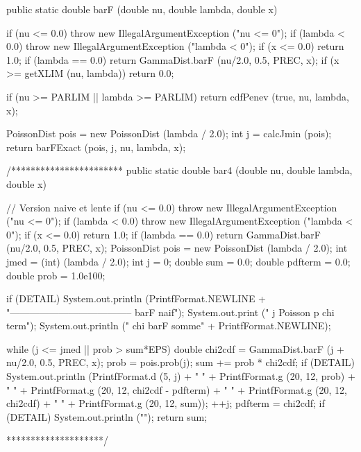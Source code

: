 \begin{code}

   public static double barF (double nu, double lambda, double x)\begin{hide} {
      if (nu <= 0.0)
         throw new IllegalArgumentException ("nu <= 0");
      if (lambda < 0.0)
         throw new IllegalArgumentException ("lambda < 0");
      if (x <= 0.0)
         return 1.0;
      if (lambda == 0.0)
         return GammaDist.barF (nu/2.0, 0.5, PREC, x);
      if (x >= getXLIM (nu, lambda))
         return 0.0;

      if (nu >= PARLIM || lambda >= PARLIM)
         return cdfPenev (true, nu, lambda, x);

      PoissonDist pois = new PoissonDist (lambda / 2.0);
      int j = calcJmin (pois);
      return barFExact (pois, j, nu, lambda, x);
   }

/***********************
   public static double bar4 (double nu, double lambda, double x)
   {
      // Version naive et lente
      if (nu <= 0.0)
         throw new IllegalArgumentException ("nu <= 0");
      if (lambda < 0.0)
         throw new IllegalArgumentException ("lambda < 0");
      if (x <= 0.0)
         return 1.0;
      if (lambda == 0.0)
         return GammaDist.barF (nu/2.0, 0.5, PREC, x);
      PoissonDist pois = new PoissonDist (lambda / 2.0);
      int jmed = (int) (lambda / 2.0);
      int j = 0;
      double sum = 0.0;
      double pdfterm = 0.0;
      double prob = 1.0e100;

      if (DETAIL) {
         System.out.println (PrintfFormat.NEWLINE +
             "-------------------------------------- barF naif");
         System.out.print ("   j             Poisson p               chi term");
         System.out.println ("               chi barF            somme" +
             PrintfFormat.NEWLINE);
      }

      while (j <= jmed || prob > sum*EPS)
      {
         double chi2cdf = GammaDist.barF (j + nu/2.0, 0.5, PREC, x);
         prob = pois.prob(j);
         sum += prob * chi2cdf;
         if (DETAIL)
            System.out.println (PrintfFormat.d (5, j) + "   " +
                                PrintfFormat.g (20, 12, prob) + "   " +
                       PrintfFormat.g (20, 12, chi2cdf - pdfterm) + "   " +
                                PrintfFormat.g (20, 12, chi2cdf) + "   " +
                                PrintfFormat.g (20, 12, sum));
         ++j;
         pdfterm = chi2cdf;
      }
      if (DETAIL)
         System.out.println ("");
      return sum;
   }
********************/


\end{hide}
\end{code}
